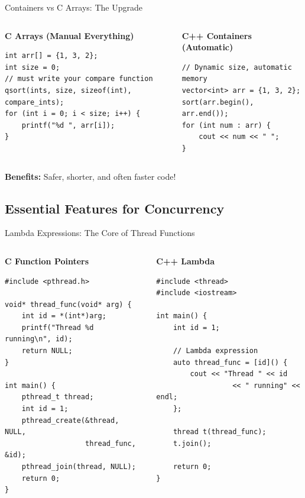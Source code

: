 \begin{frame}[fragile]{ Containers vs C Arrays: The Upgrade}
	\begin{columns}
		\begin{column}{0.5\textwidth}
			\textbf{C Arrays (Manual Everything)}
			\begin{verbatim}
int arr[] = {1, 3, 2};
int size = 0;
// must write your compare function
qsort(ints, size, sizeof(int), compare_ints);
for (int i = 0; i < size; i++) {
    printf("%d ", arr[i]);
}
			\end{verbatim}
		\end{column}
		\begin{column}{0.5\textwidth}
			\textbf{C++ Containers (Automatic)}
			\begin{verbatim}
// Dynamic size, automatic memory
vector<int> arr = {1, 3, 2};
sort(arr.begin(), arr.end());
for (int num : arr) {
    cout << num << " ";
}
			\end{verbatim}
		\end{column}
	\end{columns}

	\vspace{0.5em}
	\textbf{Benefits:} Safer, shorter, and often faster code!
\end{frame}

\subsection{Essential Features for Concurrency}
\begin{frame}[fragile]{ Lambda Expressions: The Core of Thread Functions}
	\begin{columns}
		\begin{column}{0.5\textwidth}
			\textbf{C Function Pointers}
			\begin{verbatim}
#include <pthread.h>

void* thread_func(void* arg) {
    int id = *(int*)arg;
    printf("Thread %d running\n", id);
    return NULL;
}

int main() {
    pthread_t thread;
    int id = 1;
    pthread_create(&thread, NULL,
                   thread_func, &id);
    pthread_join(thread, NULL);
    return 0;
}
			\end{verbatim}
		\end{column}
		\begin{column}{0.5\textwidth}
			\textbf{C++ Lambda}
			\begin{verbatim}
#include <thread>
#include <iostream>

int main() {
    int id = 1;

    // Lambda expression
    auto thread_func = [id]() {
        cout << "Thread " << id
                  << " running" << endl;
    };

    thread t(thread_func);
    t.join();

    return 0;
}
			\end{verbatim}
		\end{column}
	\end{columns}

\end{frame}

